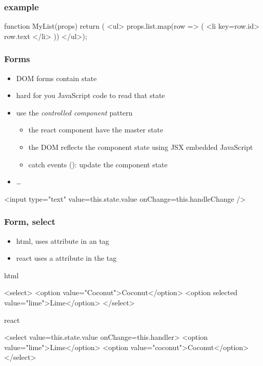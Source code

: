 \begin{frame}[fragile] \frametitle{ example}

\begin{CodeBox}{}
function MyList(props) { return (
  <ul>
    props.list.map(row => (
      <li key={row.id}>
        {row.text}
      </li>
    ))
  </ul>);
}
\end{CodeBox}
\end{frame}

\begin{frame}[fragile] \frametitle{Forms}
\begin{itemize}
  \item DOM forms contain state
  \item hard for you JavaScript code to read that state
  \item use the \emph{controlled component} pattern
  \begin{itemize}
    \item the react component have the master state
    \item the DOM reflects the component state using JSX embedded JavaScript
    \item catch events (): update the component state
  \end{itemize}
  \item {} \ldots {}
\end{itemize}
\vspace{5mm}
\begin{CodeBox}{}
<input type="text" 
        value={this.state.value}
        onChange={this.handleChange}
/>
\end{CodeBox}
\end{frame}

\begin{frame}[fragile] \frametitle{Form, select}
\begin{itemize}
  \item html, uses  attribute in an  tag
  \item react uses a  attribute in the  tag
\end{itemize}
\vspace{3mm}
html
\begin{CodeBox}{}
<select>
  <option value="Coconut">Coconut</option>
  <option selected value="lime">Lime</option>
</select>\end{CodeBox}
\vspace{3mm}
react
\begin{CodeBox}{}
<select value={this.state.value} onChange={this.handler}>
  <option value="lime">Lime</option>
  <option value="coconut">Coconut</option>
</select>\end{CodeBox}
\end{frame}


